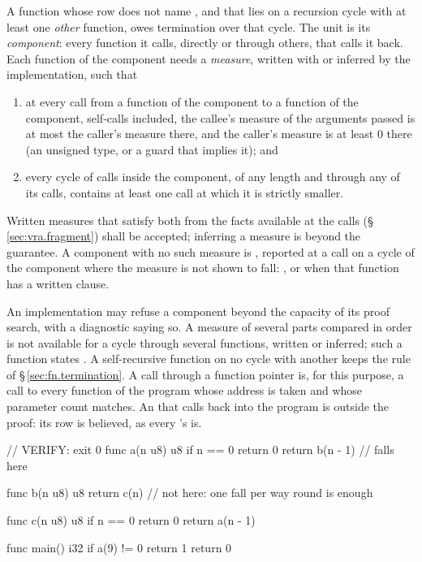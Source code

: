 \begin{constraint}
  A function whose row does not name , and that lies on a recursion cycle with
  at least one \emph{other} function, owes termination over that cycle.  The unit is its
  \emph{component}: every function it calls, directly or through others, that calls it back.
  Each function of the component needs a \emph{measure}, written with  or
  inferred by the implementation, such that
  \begin{enumerate}
    \item at every call from a function of the component to a function of the component,
          self-calls included, the callee's measure of the arguments passed is at most the
          caller's measure there, and the caller's measure is at least 0 there (an unsigned
          type, or a guard that implies it); and
    \item every cycle of calls inside the component, of any length and through any of its
          calls, contains at least one call at which it is strictly smaller.
  \end{enumerate}
  Written measures that satisfy both from the facts available at the calls
  (\S\,\ref{sec:vra.fragment}) shall be accepted; inferring a measure is beyond the guarantee.
  A component with no such measure is \illformed{}, reported at a call on a cycle of the
  component where the measure is not shown to fall: , or  when
  that function has a written  clause.
\end{constraint}

\begin{note}
  An implementation may refuse a component beyond the capacity of its proof search, with a
  diagnostic saying so.  A measure of several parts compared in order is not available for a
  cycle through several functions, written or inferred; such a function states
  .  A self-recursive function on no cycle with another
  keeps the rule of \S\,\ref{sec:fn.termination}.  A call through a function pointer is, for
  this purpose, a call to every function of the program whose address is taken and whose
  parameter count matches.  An  that calls back into the program is outside the
  proof: its row is believed, as every 's is.
\end{note}

\begin{laincode}
// VERIFY: exit 0
func a(n u8) u8 {
    if n == 0 { return 0 }
    return b(n - 1)              // falls here
}

func b(n u8) u8 {
    return c(n)                  // not here: one fall per way round is enough
}

func c(n u8) u8 {
    if n == 0 { return 0 }
    return a(n - 1)
}

func main() i32 {
    if a(9) != 0 { return 1 }
    return 0
}
\end{laincode}

